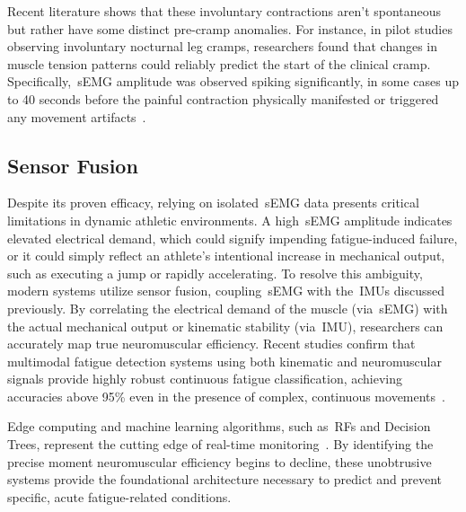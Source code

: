 Recent literature shows that 
these involuntary contractions aren't spontaneous but rather have some distinct pre-cramp anomalies. For instance, 
in pilot studies observing involuntary nocturnal leg cramps, researchers found that changes in muscle tension 
patterns could reliably predict the start of the clinical cramp. Specifically,~\gls{sEMG} amplitude was observed spiking 
significantly, in some cases up to 40 seconds before the painful contraction physically manifested or triggered 
any movement artifacts~\cite{ChangesInMuscleTension}.

\subsection{Sensor Fusion}
\label{ssec:sensor_fusion}


Despite its proven efficacy, relying on isolated~\gls{sEMG} data presents critical limitations in dynamic athletic 
environments. A high~\gls{sEMG} amplitude indicates elevated electrical demand, which could signify impending fatigue-induced 
failure, or it could simply reflect an athlete's intentional increase in mechanical output, such as executing a 
jump or rapidly accelerating. To resolve this ambiguity, modern systems utilize sensor fusion, coupling~\gls{sEMG} 
with the~\glspl{IMU} discussed previously. By correlating the electrical demand of the muscle (via~\gls{sEMG}) with 
the actual mechanical output or kinematic stability (via~\gls{IMU}), researchers can accurately map true neuromuscular
efficiency. Recent studies confirm that multimodal fatigue detection systems using both kinematic and neuromuscular 
signals provide highly robust continuous fatigue classification, achieving accuracies above 95\% even in the presence 
of complex, continuous movements~\cite{DataDrivenApproachForUpper, MultimodalFatigueDetectionSystem}. 

Edge computing and machine learning algorithms, such as~\glspl{RF} and Decision Trees, represent the cutting edge 
of real-time monitoring~\cite{MachineLearningBasedClassification}. By identifying the precise moment neuromuscular efficiency begins to decline, these 
unobtrusive systems provide the foundational architecture necessary to predict and prevent specific, acute fatigue-related 
conditions. 

